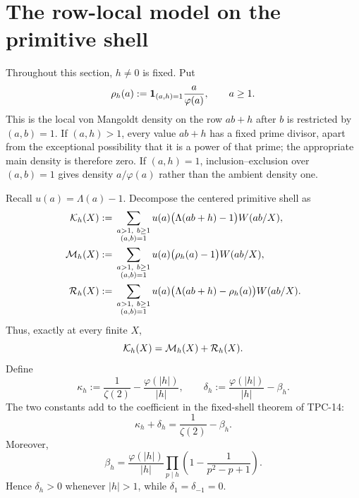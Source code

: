 \section{The row-local model on the primitive shell}
\label{sec:row-local-shell}

Throughout this section, $h\ne0$ is fixed.  Put
\begin{equation}
 \rho_h(a):=\mathbf 1_{(a,h)=1}\frac{a}{\varphi(a)},
 \qquad a\geq1.
 \label{eq:row-local-density}
\end{equation}
This is the local von Mangoldt density on the row $ab+h$ after $b$ is
restricted by $(a,b)=1$.  If $(a,h)>1$, every value $ab+h$ has a fixed
prime divisor, apart from the exceptional possibility that it is a power
of that prime; the appropriate main density is therefore zero.  If
$(a,h)=1$, inclusion--exclusion over $(a,b)=1$ gives density
$a/\varphi(a)$ rather than the ambient density one.

Recall $u(a)=\Lambda(a)-1$.  Decompose the centered primitive shell as
\begin{align}
 \mathcal K_h(X)
 &:={}
 \sum_{\substack{a>1,\ b\geq1\\(a,b)=1}}
 u(a)\bigl(\Lambda(ab+h)-1\bigr)W(ab/X),
 \label{eq:row-shell-K}\\
 \mathcal M_h(X)
 &:={}
 \sum_{\substack{a>1,\ b\geq1\\(a,b)=1}}
 u(a)\bigl(\rho_h(a)-1\bigr)W(ab/X),
 \label{eq:row-shell-M}\\
 \mathcal R_h(X)
 &:={}
 \sum_{\substack{a>1,\ b\geq1\\(a,b)=1}}
 u(a)\bigl(\Lambda(ab+h)-\rho_h(a)\bigr)W(ab/X).
 \label{eq:row-shell-R}
\end{align}
Thus, exactly at every finite $X$,
\begin{equation}
 \mathcal K_h(X)=\mathcal M_h(X)+\mathcal R_h(X).
 \label{eq:row-shell-decomposition}
\end{equation}
Define
\begin{equation}
 \kappa_h:=\frac1{\zeta(2)}-\frac{\varphi(|h|)}{|h|},
 \qquad
 \delta_h:=\frac{\varphi(|h|)}{|h|}-\beta_h.
 \label{eq:kappa-delta-definitions}
\end{equation}
The two constants add to the coefficient in the fixed-shell theorem of
TPC-14:
\begin{equation}
 \kappa_h+\delta_h=\frac1{\zeta(2)}-\beta_h.
 \label{eq:kappa-delta-sum}
\end{equation}
Moreover,
\begin{equation}
 \beta_h=\frac{\varphi(|h|)}{|h|}
 \prod_{p\mid h}\left(1-\frac1{p^2-p+1}\right).
 \label{eq:beta-relative-to-phi}
\end{equation}
Hence $\delta_h>0$ whenever $|h|>1$, while
$\delta_{1}=\delta_{-1}=0$.

